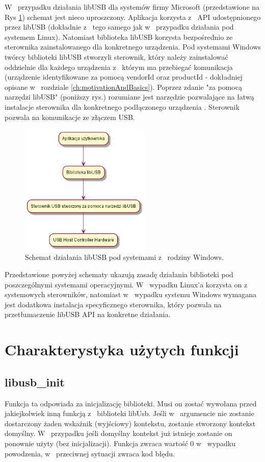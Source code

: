 \documentclass{BscUS}
\begin{document}
\noindent W~ przypadku działania libUSB dla systemów firmy Microsoft (przedstawione na Rys \ref{fig:libUsbSchemaWindows}) schemat jest nieco uproszczony. Aplikacja korzysta z~ API udostępnionego przez libUSB (dokładnie z~ tego samego jak w~ przypadku działania pod systemem Linux). Natomiast biblioteka libUSB korzysta bezpośrednio ze sterownika zainstalowanego dla konkretnego urządzenia. Pod systemami Windows twórcy biblioteki libUSB stworzyli sterownik, który należy zainstalować oddzielnie dla każdego urządzenia z~ którym ma przebiegać komunikacja (urządzenie identyfikowane za pomocą vendorId oraz productId - dokładniej opisane w~ rozdziale \ref{ch:motivationAndBasics}). Poprzez zdanie "za pomocą narzędzi libUSB" (poniższy rys.) rozumiane jest narzędzie pozwalające na łatwą instalacje sterownika dla konkretnego podłączonego urządzenia \cite{zadig}. Sterownik pozwala na komunikacje ze złączem USB.
\begin{figure}[H]
\centering
\includegraphics[width=0.55\textwidth]{./img/libUsbSchemaWindows}
\caption{Schemat działania libUSB pod systemami z~ rodziny Windows.}
\label{fig:libUsbSchemaWindows}
\end{figure}
\noindent Przedstawione powyżej schematy ukazują zasadę działania biblioteki pod poszczególnymi systemami operacyjnymi. W~ wypadku Linux'a korzysta on z~ systemowych sterowników, natomiast w~ wypadku systemu Windows wymagana jest dodatkowa instalacja specyficznego sterownika, który pozwala na przetłumaczenie libUSB API na konkretne działania.

\section{Charakterystyka użytych funkcji}
\subsection{libusb\_init}
\indent Funkcja ta odpowiada za inicjalizację biblioteki.
Musi on zostać wywołana przed jakiejkolwiek inną funkcją z~ biblioteki libUsb.
Jeśli w~ argumencie nie zostanie dostarczony żaden wskaźnik (wyjściowy) kontekstu, zostanie stworzony kontekst domyślny. W~ przypadku jeśli domyślny kontekst już istnieje zostanie on ponownie użyty (bez inicjalizacji).
Funkcja zwraca wartość 0 w~ wypadku powodzenia, w~ przeciwnej sytuacji zwraca kod błędu.
\end{document}
